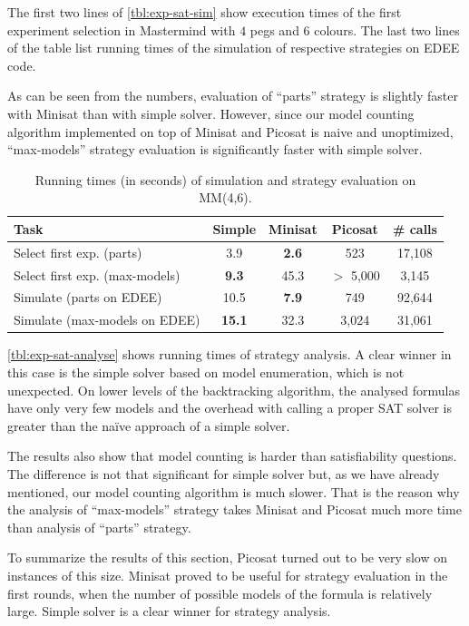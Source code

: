 The first two lines of \autoref{tbl:exp-sat-sim} show execution times of the
  first experiment selection in Mastermind with $4$ pegs and $6$ colours.
The last two lines of the table list running times of the simulation of
  respective strategies on EDEE code.

As can be seen from the numbers, evaluation of ``parts'' strategy is slightly
  faster with Minisat than with simple solver.
However, since our model counting algorithm implemented on top of Minisat and Picosat
  is naive and unoptimized, ``max-models'' strategy evaluation is significantly faster
  with simple solver.

\begin{table}[ht]
\begin{center}
\begin{tabular}{|l|c|c|c|c|} \hline
Task & Simple & Minisat & Picosat & \# calls \\ \hline
Select first exp. (parts) & 3.9 & \textbf{2.6} & 523 & 17,108 \\
Select first exp. (max-models) & \textbf{9.3} & 45.3 & $>$ 5,000 & 3,145 \\
Simulate (parts on EDEE) & 10.5 & \textbf{7.9} & 749 & 92,644 \\
Simulate (max-models on EDEE) & \textbf{15.1} & 32.3 & 3,024 & 31,061 \\\hline
\end{tabular}
\caption{Running times (in seconds) of simulation and strategy evaluation on MM(4,6).}
\label{tbl:exp-sat-sim}
\end{center}
\end{table}

\autoref{tbl:exp-sat-analyse}
  shows running times of strategy analysis.
A clear winner in this case is the simple solver based on
  model enumeration,
  which is not unexpected.
On lower levels of the backtracking algorithm,
  the analysed formulas have only very few models and the
  overhead with calling a proper SAT solver is greater
  than the na\"ive approach of a simple solver.

The results also show that model counting is harder than satisfiability questions.
The difference is not that significant for simple solver
 but, as we have already mentioned, our model counting algorithm is much slower.
That is the reason why the analysis of ``max-models'' strategy takes Minisat and Picosat
  much more time than analysis of ``parts'' strategy.

To summarize the results of this section,
Picosat turned out to be very slow on instances of this size. Minisat proved to be
useful for strategy evaluation in the first rounds, when the number of possible
models of the formula is relatively large.
Simple solver is a clear winner for strategy analysis.

